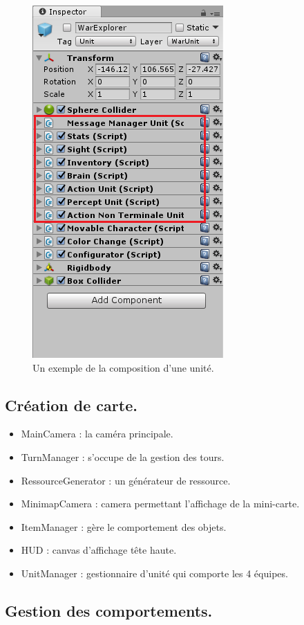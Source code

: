 \documentclass{report}
\begin{document}
\begin{figure}[!h]
\centering
\includegraphics[scale = 0.7]{WarUnitImage}
\caption{Un exemple de la composition d'une unité.}
\end{figure}

\subsection{Création de carte.}
\begin{itemize}
\item MainCamera : la caméra principale.
\item TurnManager : s'occupe de la gestion des tours.
\item RessourceGenerator : un générateur de ressource.
\item MinimapCamera : camera permettant l'affichage de la mini-carte.
\item ItemManager : gère le comportement des objets.
\item HUD : canvas d'affichage tête haute.
\item UnitManager : gestionnaire d'unité qui comporte les 4 équipes.
\end{itemize}
\subsection{Gestion des comportements.}
\end{document}
